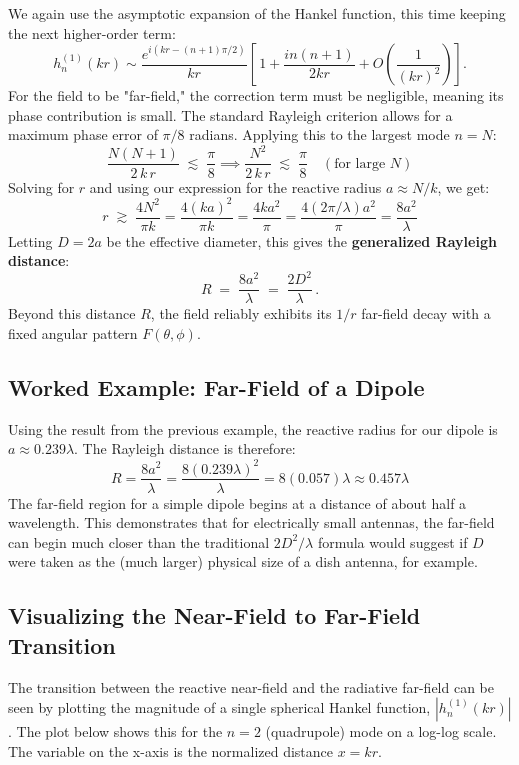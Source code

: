 \documentclass[11pt]{article}
\begin{document}
We again use the asymptotic expansion of the Hankel function, this time keeping the next higher-order term:
\[
h_n^{(1)}(kr)\sim\frac{e^{i(kr - (n+1)\pi/2)}}{kr}\left[\,1 + \frac{i n(n+1)}{2kr} + O\left(\frac{1}{(kr)^2}\right)\right].
\]
For the field to be "far-field," the correction term must be negligible, meaning its phase contribution is small. The standard Rayleigh criterion allows for a maximum phase error of $\pi/8$ radians. Applying this to the largest mode $n=N$:
\[
\frac{N(N+1)}{2\,k\,r}\;\lesssim\;\frac\pi8 \implies \frac{N^2}{2\,k\,r}\;\lesssim\;\frac\pi8 \quad(\text{for large } N)
\]
Solving for $r$ and using our expression for the reactive radius $a \approx N/k$, we get:
\[
r\;\gtrsim\; \frac{4N^2}{\pi k} = \frac{4(ka)^2}{\pi k} = \frac{4ka^2}{\pi} = \frac{4(2\pi/\lambda)a^2}{\pi} = \frac{8a^2}{\lambda}
\]
Letting $D=2a$ be the effective diameter, this gives the \textbf{generalized Rayleigh distance}:
\begin{equation}\label{eq:rayleigh_distance}
R \;=\;\frac{8a^2}{\lambda}\;=\;\frac{2D^2}{\lambda}\,.
\end{equation}
Beyond this distance $R$, the field reliably exhibits its $1/r$ far-field decay with a fixed angular pattern $F(\theta,\phi)$.

\subsection{Worked Example: Far-Field of a Dipole}
Using the result from the previous example, the reactive radius for our dipole is $a \approx 0.239\lambda$. The Rayleigh distance is therefore:
\[ R = \frac{8a^2}{\lambda} = \frac{8(0.239\lambda)^2}{\lambda} = 8(0.057)\lambda \approx 0.457\lambda \]
The far-field region for a simple dipole begins at a distance of about half a wavelength. This demonstrates that for electrically small antennas, the far-field can begin much closer than the traditional $2D^2/\lambda$ formula would suggest if $D$ were taken as the (much larger) physical size of a dish antenna, for example.

\subsection{Visualizing the Near-Field to Far-Field Transition}
The transition between the reactive near-field and the radiative far-field can be seen by plotting the magnitude of a single spherical Hankel function, $|h_n^{(1)}(kr)|$. The plot below shows this for the $n=2$ (quadrupole) mode on a log-log scale. The variable on the x-axis is the normalized distance $x=kr$.
\end{document}
